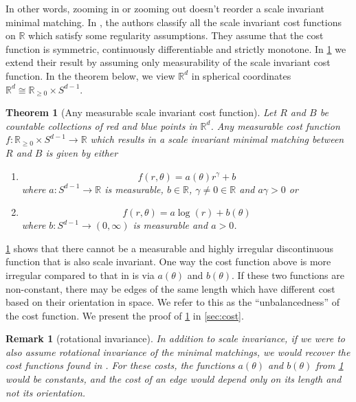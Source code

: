\documentclass{article}
\newtheorem{theorem}{Theorem}[section]
\newtheorem{remark}{Remark}
\newcommand{\R}{\mathbb{R}}
\begin{document}
In other words,
zooming in or zooming out doesn't reorder a scale invariant minimal matching.
In \cite[Proposition 18]{minimal}, the authors classify all the scale
invariant cost functions on $\R$ which satisfy some regularity assumptions.
They assume that the cost function is symmetric, continuously
differentiable and strictly monotone. In \cref{thm:unbalcost} we
extend their result by assuming only measurability of the scale invariant cost
function.
In the theorem below, we view $\R^d$ in  spherical coordinates
$\R^d\cong\R_{\geq 0}\times S^{d-1}$.
\begin{samepage}
  \begin{theorem}[Any measurable scale invariant cost function]
  \label{thm:unbalcost}
 Let $R$ and $B$ be countable collections of red and blue points in $\R^d$. Any measurable  cost
function $f:\R_{\geq 0}\times S^{d-1}\rightarrow \R$ which results in
 a scale invariant minimal matching between $R$ and $B$ is given by
either
\begin{enumerate}
\item   \begin{equation} \label{eq:tmp1}
    f(r,\theta)=
      a(\theta)r^{\gamma}+b
    \end{equation}
    where $a:S^{d-1}\rightarrow\R$ is measurable, $b\in\R$, $\gamma\neq 0\in\R$ and
    $a\gamma>0$ or
  \item   \begin{equation}\label{eq:tmp2}
    f(r,\theta) = a \log(r)+b(\theta)
  \end{equation}
where $b:S^{d-1}\rightarrow(0,\infty)$ is measurable and $a>0$.
\end{enumerate}
\end{theorem}
\end{samepage}

 \cref{thm:unbalcost} shows that there cannot be a measurable and highly irregular
 discontinuous function that is also scale invariant. One way the cost
 function above is more  irregular compared to that in \cite{minimal}
 is via $a(\theta)$ and $b(\theta)$. If these two functions are
 non-constant, there may be edges of the same length which
 have different cost based on their orientation in space. We refer to
 this as the ``unbalancedness'' of the cost function. We present the proof of \cref{thm:unbalcost} in \cref{sec:cost}.

\begin{remark}[rotational invariance]
  In addition to scale invariance, if we were
  to also assume rotational invariance of the minimal matchings, we would
  recover the cost functions found in \cite{minimal}. For these costs,
  the functions $a(\theta)$ and $b(\theta)$ from \cref{thm:unbalcost}
  would be constants, and the cost of an edge would
  depend only on its length
  and not its orientation.\end{remark}
\end{document}
